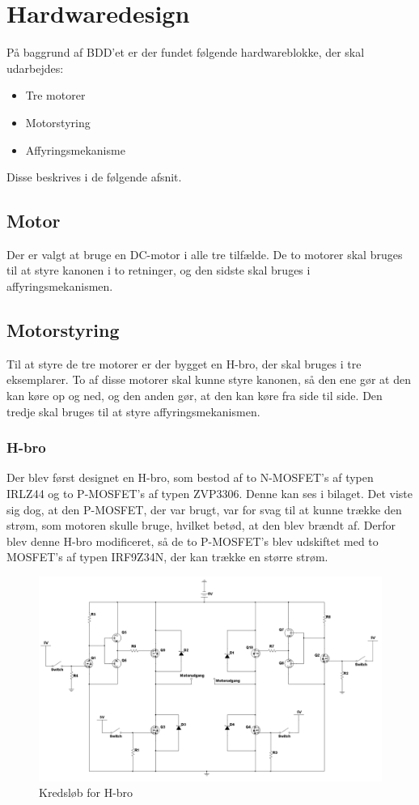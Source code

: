 \section{Hardwaredesign}
På baggrund af BDD'et er der fundet følgende hardwareblokke, der skal udarbejdes: 

\begin{itemize}
	\item Tre motorer
	\item Motorstyring
	\item Affyringsmekanisme 
\end{itemize}

Disse beskrives i de følgende afsnit. 

\subsection{Motor}
Der er valgt at bruge en DC-motor i alle tre tilfælde. De to motorer skal bruges til at styre kanonen i to retninger, og den sidste skal bruges i affyringsmekanismen. 

\subsection{Motorstyring}
Til at styre de tre motorer er der bygget en H-bro, der skal bruges i tre eksemplarer. To af disse motorer skal kunne styre kanonen, så den ene gør at den kan køre op og ned, og den anden gør, at den kan køre fra side til side. Den tredje skal bruges til at styre affyringsmekanismen. 

\subsubsection{H-bro}
Der blev først designet en H-bro, som bestod af to N-MOSFET's af typen IRLZ44 og to P-MOSFET's af typen ZVP3306. Denne kan ses i bilaget. Det viste sig dog, at den P-MOSFET, der var brugt, var for svag til at kunne trække den strøm, som motoren skulle bruge, hvilket betød, at den blev brændt af. Derfor blev denne H-bro modificeret, så de to P-MOSFET's blev udskiftet med to MOSFET's af typen IRF9Z34N, der kan trække en større strøm. 

\begin{figure}[H]
	\centering
	\includegraphics[width=\textwidth]{DesignOgImplementering/images/H-bro}
	\caption{Kredsløb for H-bro}
	\label{fig:hbro}
	\end{figure}

